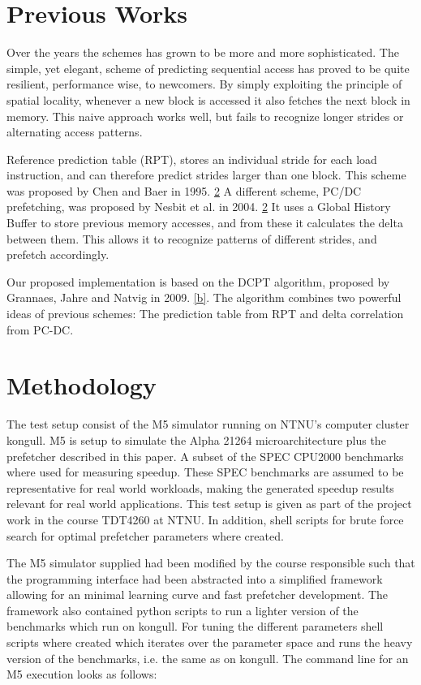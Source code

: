 \documentclass[12pt,journal,compsoc]{IEEEtran}
\begin{document}
\section{Previous Works}
Over the years the schemes has grown to be more and more sophisticated. The
simple, yet elegant, scheme of predicting sequential access has proved to be
quite resilient, performance wise, to newcomers. By simply exploiting the
principle of spatial locality, whenever a new block is accessed it also fetches 
the next block in memory. This naive approach works well, but fails to recognize
longer strides or alternating access patterns.

Reference prediction table (RPT), stores an individual stride for each load
instruction, and can therefore predict strides larger than one block. This
scheme was proposed by Chen and Baer in 1995. \ref{} A different scheme, PC/DC
prefetching, was proposed by Nesbit et al. in 2004. \ref{} It uses a Global
History Buffer to store previous memory accesses, and from these it calculates
the delta between them. This allows it to recognize patterns of different
strides, and prefetch accordingly.

Our proposed implementation is based on the DCPT algorithm, proposed by
Grannaes, Jahre and Natvig in 2009.  \ref{b}. The algorithm combines two
powerful ideas of previous schemes: The prediction table from RPT and delta
correlation from PC-DC.

\section{Methodology}
The test setup consist of the M5 simulator running on NTNU's computer
cluster kongull. M5 is setup to simulate the Alpha 21264 microarchitecture
plus the prefetcher described in this paper. A subset of the SPEC CPU2000
benchmarks where used for measuring speedup. These SPEC benchmarks are assumed
to be representative for real world workloads, making the generated speedup
results relevant for real world applications. This test setup is given
as part of the project work in the course TDT4260 at NTNU. In addition,
shell scripts for brute force search for optimal prefetcher parameters
where created.

The M5 simulator supplied had been modified by the course responsible such
that the programming interface had been abstracted into a simplified framework
allowing for an minimal learning curve and fast prefetcher development. The
framework also contained python scripts to run a lighter version of the
benchmarks which run on kongull. For tuning the different parameters shell
scripts where created which iterates over the parameter space and runs the
heavy version of the benchmarks, i.e. the same as on kongull. The command line
for an M5 execution looks as follows:
\end{document}
